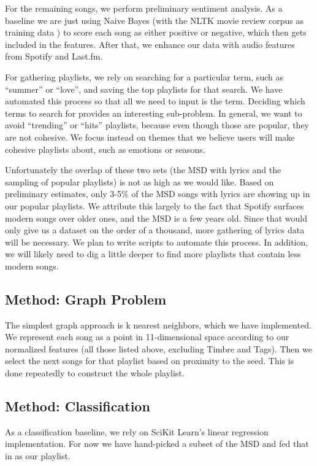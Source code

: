 \documentclass[10pt,journal,compsoc]{IEEEtran}
\begin{document}
For the remaining songs, we perform preliminary sentiment analysis. As a baseline we are just using Naive Bayes (with the NLTK movie review corpus as training data \cite{nltk}) to score each song as either positive or negative, which then gets included in the features. After that, we enhance our data with audio features from Spotify and Last.fm.

For gathering playlists, we rely on searching for a particular term, such as ``summer'' or ``love'', and saving the top playlists for that search. We have automated this process so that all we need to input is the term. Deciding which terms to search for provides an interesting sub-problem. In general, we want to avoid ``trending'' or ``hits'' playlists, because even though those are popular, they are not cohesive. We focus instead on themes that we believe users will make cohesive playlists about, such as emotions or seasons.

Unfortunately the overlap of these two sets (the MSD with lyrics and the sampling of popular playlists) is not as high as we would like. Based on preliminary estimates, only 3-5\% of the MSD songs with lyrics are showing up in our popular playlists. We attribute this largely to the fact that Spotify surfaces modern songs over older ones, and the MSD is a few years old. Since that would only give us a dataset on the order of a thousand, more gathering of lyrics data will be necessary. We plan to write scripts to automate this process. In addition, we will likely need to dig a little deeper to find more playlists that contain less modern songs.

\subsection{Method: Graph Problem}
The simplest graph approach is k nearest neighbors, which we have implemented. We represent each song as a point in 11-dimensional space according to our normalized features (all those listed above, excluding Timbre and Tags). Then we select the next songs for that playlist based on proximity to the seed. This is done repeatedly to construct the whole playlist.

\subsection{Method: Classification}
As a classification baseline, we rely on SciKit Learn's \cite{scikit} linear regression implementation. For now we have hand-picked a subset of the MSD and fed that in as our playlist.
\end{document}
